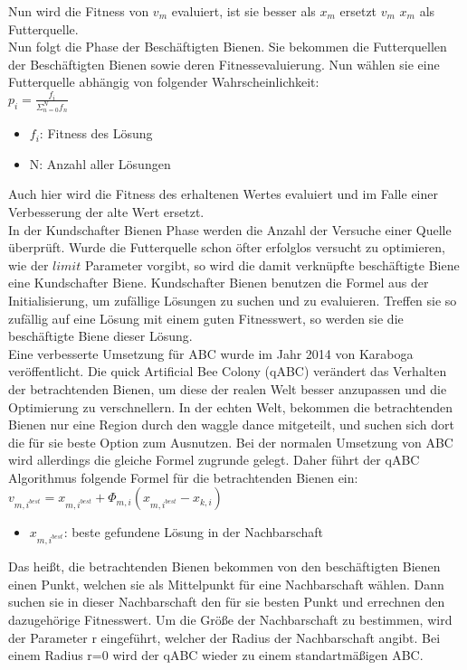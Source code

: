 Nun wird die Fitness von $v_{m}$ evaluiert, ist sie besser als $x_m$ ersetzt $v_m$ $x_m$ als Futterquelle.\\
Nun folgt die Phase der Beschäftigten Bienen. Sie bekommen die Futterquellen der Beschäftigten Bienen sowie deren Fitnessevaluierung.  Nun wählen sie eine Futterquelle abhängig von folgender Wahrscheinlichkeit:\\ 
\large
$p_i=\frac{f_i}{\Sigma^N_{n=0}f_n}$
\normalsize
\begin{itemize}
  \item $f_i$: Fitness des Lösung
  \item N: Anzahl aller Lösungen
\end{itemize}
Auch hier wird die Fitness des erhaltenen Wertes evaluiert und im Falle einer Verbesserung der alte Wert ersetzt.\\
In der Kundschafter Bienen Phase werden die Anzahl der Versuche einer Quelle überprüft. Wurde die Futterquelle schon öfter erfolglos versucht zu optimieren, wie der $limit$ Parameter vorgibt, so wird die damit verknüpfte beschäftigte Biene eine Kundschafter Biene. Kundschafter Bienen benutzen die Formel aus der Initialisierung, um zufällige Lösungen zu suchen und zu evaluieren. Treffen sie so  zufällig auf eine Lösung mit einem guten Fitnesswert, so werden sie die beschäftigte Biene dieser Lösung.\\

Eine verbesserte Umsetzung für ABC wurde im Jahr 2014 von Karaboga veröffentlicht. Die quick Artificial Bee Colony (qABC) verändert das Verhalten der betrachtenden Bienen, um diese der realen Welt besser anzupassen und die Optimierung zu verschnellern. In der echten Welt, bekommen die betrachtenden Bienen nur eine Region durch den waggle dance mitgeteilt, und suchen sich dort die für sie beste Option zum Ausnutzen. Bei der normalen Umsetzung von ABC wird allerdings die gleiche Formel zugrunde gelegt. Daher führt der qABC Algorithmus folgende Formel für die betrachtenden Bienen ein:\\
$v_{m,i^{best}}= x_{m,i^{best}}+\Phi_{m,i}( x_{m,i^{best}}- x_{k,i})$
\begin{itemize}
  \item $x_{m,i^{best}}$: beste gefundene Lösung in der Nachbarschaft
\end{itemize}

Das heißt, die betrachtenden Bienen bekommen von den beschäftigten Bienen einen Punkt, welchen sie als Mittelpunkt für eine Nachbarschaft wählen. Dann suchen sie in dieser Nachbarschaft den für sie besten Punkt und errechnen den dazugehörige Fitnesswert. Um die Größe der Nachbarschaft zu bestimmen, wird der Parameter r eingeführt, welcher der Radius der Nachbarschaft angibt. Bei einem Radius r=0 wird der qABC wieder zu einem standartmäßigen ABC.
\\

